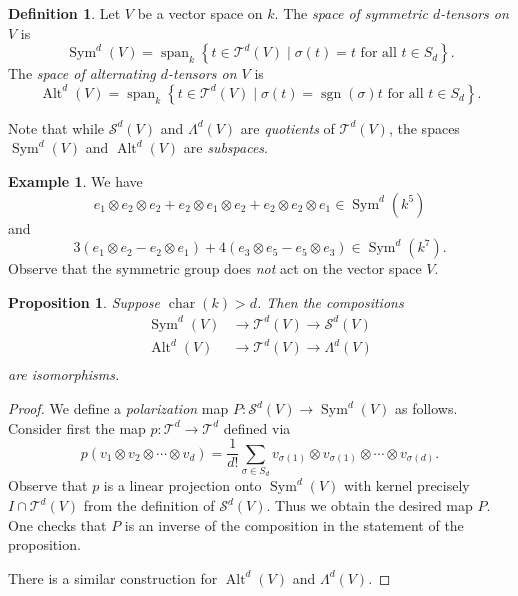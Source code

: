 \documentclass[12pt]{article}
\theoremstyle{plain}
\newtheorem{proposition}[theorem]{Proposition}
\theoremstyle{definition}
\newtheorem{definition}[theorem]{Definition}
\newtheorem{example}[theorem]{Example}
\theoremstyle{remark}
\numberwithin{equation}{section}
\begin{document}
\begin{definition}
Let $V$ be a vector space on $k$.
The \emph{space of symmetric $d$-tensors on $V$} is
\[
\operatorname{Sym}^d(V) = \operatorname{span}_k
\left\{ t \in \mathcal{T}^d(V) \mid \sigma(t)=t
\textrm{ for all } t \in S_d  \right\} .
\]
The \emph{space of alternating $d$-tensors on $V$} is
\[
\operatorname{Alt}^d(V) = \operatorname{span}_k
\left\{ t \in \mathcal{T}^d(V) \mid
\sigma(t)=\operatorname{sgn}(\sigma)t
\textrm{ for all } t \in S_d  \right\} .
\]
\end{definition}

Note that while $\mathcal{S}^d(V)$ and $\Lambda^d(V)$ are
\emph{quotients} of $\mathcal{T}^d(V)$,
the spaces $\operatorname{Sym}^d(V)$
and $\operatorname{Alt}^d(V)$
are \emph{subspaces}.

\begin{example}
We have
\[
e_1 \otimes e_2 \otimes e_2 + e_2 \otimes e_1 \otimes e_2
+ e_2 \otimes e_2 \otimes e_1 \in \operatorname{Sym}^d(k^5)
\]
and
\[
3\left(e_1 \otimes e_2 - e_2 \otimes e_1\right)
+ 4\left( e_3 \otimes e_5 - e_5 \otimes e_3 \right) 
\in \operatorname{Sym}^d(k^7).
\]
Observe that the symmetric group does \emph{not} act on the
vector space $V$.
\end{example}

\begin{proposition}
Suppose $\operatorname{char}(k) > d$.  Then the compositions
\begin{align*}
\operatorname{Sym}^d(V) &\to \mathcal{T}^d(V) \to \mathcal{S}^d(V)\\
\operatorname{Alt}^d(V) &\to \mathcal{T}^d(V) \to \Lambda^d(V)\\
\end{align*}
are isomorphisms.
\end{proposition}

\begin{proof}
We define a \emph{polarization} map
$P : \mathcal{S}^d(V) \to \operatorname{Sym}^d(V)$ as follows.
Consider first the map $p : \mathcal{T}^d \to \mathcal{T}^d$
defined via
\[
p(v_1 \otimes v_2 \otimes \cdots \otimes v_d)
= \frac{1}{d!}\sum_{\sigma \in S_d}
v_{\sigma(1)} \otimes v_{\sigma(1)} \otimes \cdots \otimes v_{\sigma(d)}
.
\]
Observe that $p$ is a linear projection onto $\operatorname{Sym}^d(V)$
with kernel precisely $I \cap \mathcal{T}^d(V)$ from the definition
of $\mathcal{S}^d(V)$.  Thus we obtain the desired map $P$.
One checks that $P$ is an inverse of the composition in the statement of
the proposition.

There is a similar construction for $\operatorname{Alt}^d(V)$
and $\Lambda^d(V)$.
\end{proof}





\end{document}
